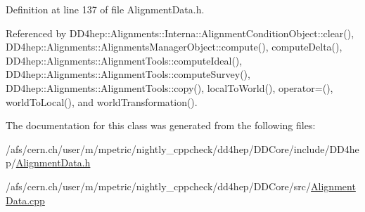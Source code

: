 Definition at line 137 of file AlignmentData.h.

Referenced by DD4hep::Alignments::Interna::AlignmentConditionObject::clear(), DD4hep::Alignments::AlignmentsManagerObject::compute(), computeDelta(), DD4hep::Alignments::AlignmentTools::computeIdeal(), DD4hep::Alignments::AlignmentTools::computeSurvey(), DD4hep::Alignments::AlignmentTools::copy(), localToWorld(), operator=(), worldToLocal(), and worldTransformation().

The documentation for this class was generated from the following files:\begin{DoxyCompactItemize}
\item 
/afs/cern.ch/user/m/mpetric/nightly\_\-cppcheck/dd4hep/DDCore/include/DD4hep/\hyperlink{_alignment_data_8h}{AlignmentData.h}\item 
/afs/cern.ch/user/m/mpetric/nightly\_\-cppcheck/dd4hep/DDCore/src/\hyperlink{_alignment_data_8cpp}{AlignmentData.cpp}\end{DoxyCompactItemize}
